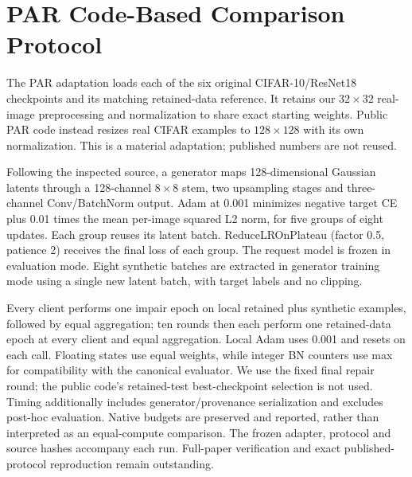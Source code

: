 \section{PAR Code-Based Comparison Protocol}
\label{sec:parprotocol}
The PAR adaptation loads each of the six original CIFAR-10/ResNet18 checkpoints
and its matching retained-data reference. It retains our $32\times32$ real-image
preprocessing and normalization to share exact starting weights. Public PAR
code instead resizes real CIFAR examples to $128\times128$ with its own
normalization. This is a material adaptation; published numbers are not reused.

Following the inspected source, a generator maps 128-dimensional Gaussian
latents through a 128-channel $8\times8$ stem, two upsampling stages and
three-channel Conv/BatchNorm output. Adam at 0.001 minimizes negative target CE
plus 0.01 times the mean per-image squared L2 norm, for five groups of eight
updates. Each group reuses its latent batch. ReduceLROnPlateau (factor 0.5,
patience 2) receives the final loss of each group. The request model is frozen
in evaluation mode. Eight synthetic batches are extracted in generator training
mode using a single new latent batch, with target labels and no clipping.

Every client performs one impair epoch on local retained plus synthetic
examples, followed by equal aggregation; ten rounds then each perform one
retained-data epoch at every client and equal aggregation. Local Adam uses
0.001 and resets on each call. Floating states use equal weights, while integer
BN counters use max for compatibility with the canonical evaluator. We use the
fixed final repair round; the public code's retained-test best-checkpoint
selection is not used. Timing additionally includes generator/provenance
serialization and excludes post-hoc evaluation. Native budgets are preserved
and reported, rather than interpreted as an equal-compute comparison.
The frozen adapter, protocol and source hashes accompany each run. Full-paper
verification and exact published-protocol reproduction remain outstanding.

